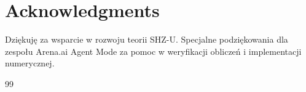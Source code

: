 \documentclass[11pt,a4paper]{article}
\begin{document}
\bigskip

\section{Acknowledgments}

Dziękuję za wsparcie w rozwoju teorii SHZ-U. Specjalne podziękowania dla zespołu Arena.ai Agent Mode za pomoc w weryfikacji obliczeń i implementacji numerycznej.

\bigskip

\begin{thebibliography}{99}








\end{thebibliography}
\end{document}
